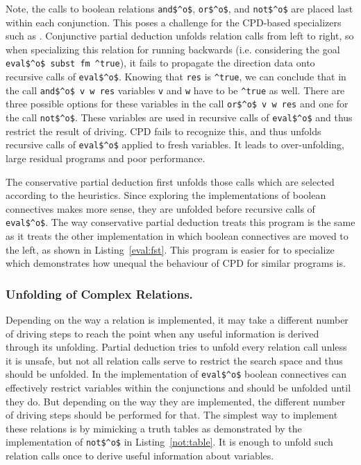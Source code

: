 Note, the calls to boolean relations \lstinline{and$^o$}, \lstinline{or$^o$}, and \lstinline{not$^o$} are placed last within each conjunction.
This poses a challenge for the CPD-based specializers such as \ecce.
Conjunctive partial deduction unfolds relation calls from left to right, so when specializing this relation for running backwards (i.e. considering the goal \lstinline{eval$^o$ subst fm ^true}), it fails to propagate the direction data onto recursive calls of \lstinline{eval$^o$}.
Knowing that \lstinline{res} is \lstinline{^true}, we can conclude that in the call \lstinline{and$^o$ v w res} variables \lstinline{v} and \lstinline{w} have to be \lstinline{^true} as well.
There are three possible options for these variables in the call \lstinline{or$^o$ v w res} and one for the call \lstinline{not$^o$}.
These variables are used in recursive calls of \lstinline{eval$^o$} and thus restrict the result of driving.
CPD fails to recognize this, and thus unfolds recursive calls of \lstinline{eval$^o$} applied to fresh variables.
It leads to over-unfolding, large residual programs and poor performance.

The conservative partial deduction first unfolds those calls which are selected according to the heuristics.
Since exploring the implementations of boolean connectives makes more sense, they are unfolded before recursive calls of \lstinline{eval$^o$}.
The way conservative partial deduction treats this program is the same as it treats the other implementation in which boolean connectives
are moved to the left, as shown in Listing~\ref{eval:fst}.
This program is easier for \ecce to specialize which demonstrates how unequal the behaviour of CPD for similar programs is.

\subsubsection{Unfolding of Complex Relations.}

Depending on the way a relation is implemented, it may take a different number of driving steps to reach the point when any useful information is derived through its unfolding.
Partial deduction tries to unfold every relation call unless it is unsafe, but not all relation calls serve to restrict the search space and thus should be unfolded.
In the implementation of \lstinline{eval$^o$} boolean connectives can effectively restrict variables within the conjunctions and should be unfolded until they do.
But depending on the way they are implemented, the different number of driving steps should be performed for that.
The simplest way to implement these relations is by mimicking a truth tables as demonstrated by the implementation of \lstinline{not$^o$} in Listing~\ref{not:table}.
It is enough to unfold such relation calls once to derive useful information about variables.


